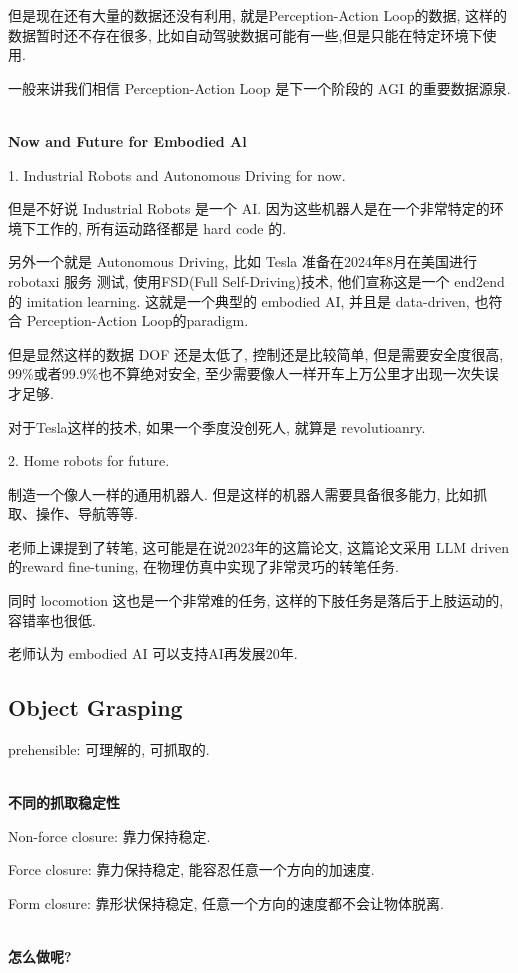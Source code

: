 但是现在还有大量的数据还没有利用, 就是Perception-Action Loop的数据, 
这样的数据暂时还不存在很多, 比如自动驾驶数据可能有一些,但是只能在特定环境下使用.

一般来讲我们相信 Perception-Action Loop 是下一个阶段的 AGI 的重要数据源泉.

\textbf{\\Now and Future for Embodied Al}

1. Industrial Robots and Autonomous Driving for now.

但是不好说 Industrial Robots 是一个 AI. 因为这些机器人是在一个非常特定的环境下工作的, 
所有运动路径都是 hard code 的.

另外一个就是 Autonomous Driving, 比如 Tesla 准备在2024年8月在美国进行 robotaxi 服务
测试, 使用FSD(Full Self-Driving)技术, 他们宣称这是一个 end2end 的 imitation learning.
这就是一个典型的 embodied AI, 并且是 data-driven, 也符合 Perception-Action Loop的paradigm.

但是显然这样的数据 DOF 还是太低了, 控制还是比较简单, 但是需要安全度很高, 
99\%或者99.9\%也不算绝对安全,
至少需要像人一样开车上万公里才出现一次失误才足够.

对于Tesla这样的技术, 如果一个季度没创死人, 就算是 revolutioanry.

2. Home robots for future.

制造一个像人一样的通用机器人. 但是这样的机器人需要具备很多能力, 比如抓取、操作、导航等等.

老师上课提到了转笔, 这可能是在说2023年的这篇论文\cite{ma2023eureka}, 这篇论文采用
LLM driven的reward fine-tuning, 在物理仿真中实现了非常灵巧的转笔任务.

同时 locomotion 这也是一个非常难的任务, 这样的下肢任务是落后于上肢运动的, 容错率也很低.

老师认为 embodied AI 可以支持AI再发展20年.

\subsection{Object Grasping}

prehensible: 可理解的, 可抓取的.

\textbf{\\不同的抓取稳定性}

Non-force closure: 靠力保持稳定.

Force closure: 靠力保持稳定, 能容忍任意一个方向的加速度.

Form closure: 靠形状保持稳定, 任意一个方向的速度都不会让物体脱离.

\textbf{\\怎么做呢?}

